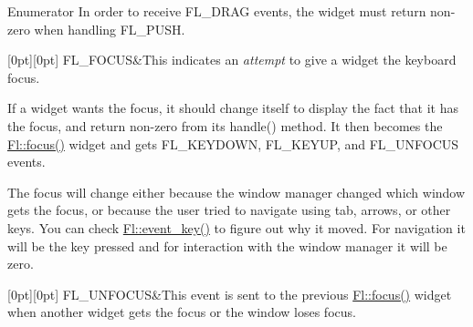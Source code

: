\begin{DoxyEnumFields}{Enumerator}
In order to receive F\+L\+\_\+\+D\+R\+AG events, the widget must return non-\/zero when handling F\+L\+\_\+\+P\+U\+SH. \\
\hline

[0pt][0pt]{}\mbox{\label{_enumerations_8_h_ad16daf120d9a0501cccaee563af0b9a3adaac2a187beb309443d668a20a59986b}} 
F\+L\+\_\+\+F\+O\+C\+US&This indicates an {\itshape attempt} to give a widget the keyboard focus.

If a widget wants the focus, it should change itself to display the fact that it has the focus, and return non-\/zero from its handle() method. It then becomes the \hyperlink{group__fl__events_ga7f0e9836db43268979e0b3a999583b7f}{Fl\+::focus()} widget and gets F\+L\+\_\+\+K\+E\+Y\+D\+O\+WN, F\+L\+\_\+\+K\+E\+Y\+UP, and F\+L\+\_\+\+U\+N\+F\+O\+C\+US events.

The focus will change either because the window manager changed which window gets the focus, or because the user tried to navigate using tab, arrows, or other keys. You can check \hyperlink{group__fl__events_ga1ac131e3cd5ca674cc022b1f77233449}{Fl\+::event\+\_\+key()} to figure out why it moved. For navigation it will be the key pressed and for interaction with the window manager it will be zero. \\
\hline

[0pt][0pt]{}\mbox{\label{_enumerations_8_h_ad16daf120d9a0501cccaee563af0b9a3a7d2e5eb9247b1927ba5cc26dc82acaf3}} 
F\+L\+\_\+\+U\+N\+F\+O\+C\+US&This event is sent to the previous \hyperlink{group__fl__events_ga7f0e9836db43268979e0b3a999583b7f}{Fl\+::focus()} widget when another widget gets the focus or the window loses focus. \\
\hline


\end{DoxyEnumFields}
